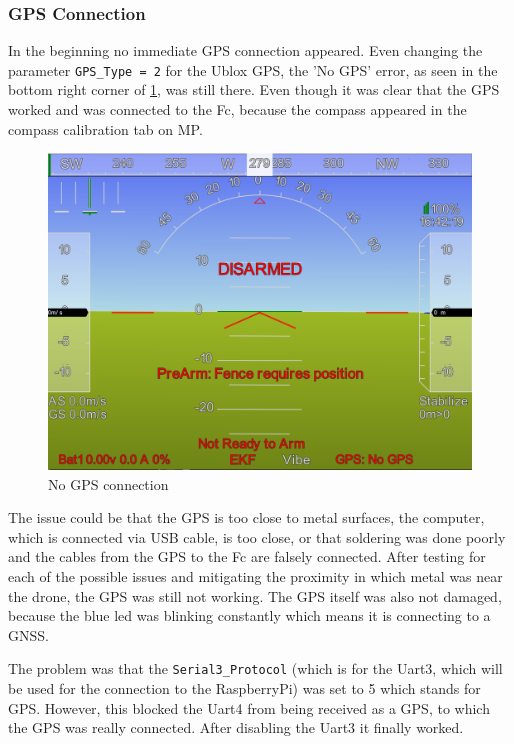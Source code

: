 \documentclass[svgnames]{article}
\begin{document}
	\subsubsection{GPS Connection}
	In the beginning no immediate \gls{GPS} connection appeared. Even changing the parameter \lstinline|GPS_Type = 2| for the Ublox \gls{GPS}, the 'No \gls{GPS}' error, as seen in the bottom right corner of \cref{fig:nogps}, was still there. Even though it was clear that the \gls{GPS} worked and was connected to the \gls{Fc}, because the compass appeared in the compass calibration tab on \gls{MP}.
\begin{figure}[ht]
	\centering
	\includegraphics[scale=0.2]{pictures/No_GPS}
	\caption{No \gls{GPS} connection}
	\label{fig:nogps}
\end{figure}

	The issue could be that the \gls{GPS} is too close to metal surfaces, the computer, which is connected via USB cable, is too close, or that soldering was done poorly and the cables from the \gls{GPS} to the \gls{Fc} are falsely connected. After testing for each of the possible issues and mitigating the proximity in which metal was near the drone, the \gls{GPS} was still not working. The GPS itself was also not damaged, because the blue led was blinking constantly which means it is connecting to a \gls{GNSS}.

	The problem was that the \lstinline|Serial3_Protocol| (which is for the Uart3, which will be used for the connection to the RaspberryPi) was set to 5 which stands for \gls{GPS}. However, this blocked the Uart4 from being received as a \gls{GPS}, to which the \gls{GPS} was really connected. After disabling the Uart3 it finally worked.
\end{document}
